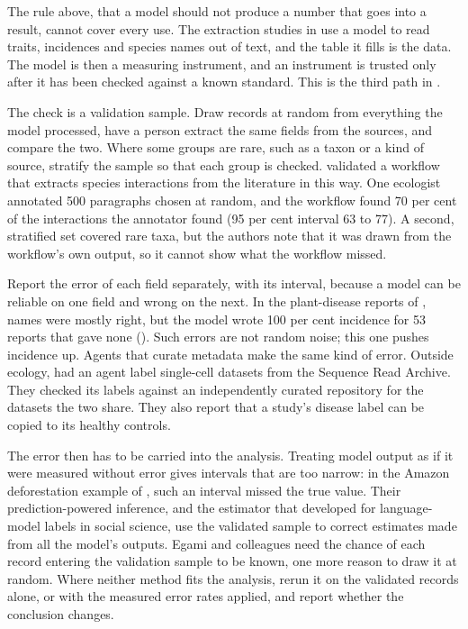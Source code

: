 The rule above, that a model should not produce a number that goes into a
result, cannot cover every use. The extraction studies in
 use a model to read traits, incidences and species
names out of text, and the table it fills is the data. The model is then a
measuring instrument, and an instrument is trusted only after it has been
checked against a known standard. This is the third path in .

The check is a validation sample. Draw records at random from everything the
model processed, have a person extract the same fields from the sources, and
compare the two. Where some groups are rare, such as a taxon or a kind of
source, stratify the sample so that each group is checked.
\textcite{keck2026interactions} validated a workflow that extracts species
interactions from the literature in this way. One ecologist annotated 500
paragraphs chosen at random, and the workflow found 70 per cent of the
interactions the annotator found (95 per cent interval 63 to 77). A second,
stratified set covered rare taxa, but the authors note that it was drawn from
the workflow's own output, so it cannot show what the workflow missed.

Report the error of each field separately, with its interval, because a model
can be reliable on one field and wrong on the next. In the plant-disease
reports of \textcite{gougherty2024extraction}, names were mostly right, but
the model wrote 100 per cent incidence for 53 reports that gave none
(). Such errors are not random noise; this one pushes
incidence up. Agents that curate metadata make the same kind of error.
Outside ecology, \textcite{youngblut2026scbasecount} had an agent label
single-cell datasets from the Sequence Read Archive. They checked its labels
against an independently curated repository for the datasets the two share.
They also report that a study's disease label can be copied to its healthy
controls.

The error then has to be carried into the analysis. Treating model output as
if it were measured without error gives intervals that are too narrow: in the
Amazon deforestation example of \textcite{angelopoulos2023ppi}, such an
interval missed the true value. Their prediction-powered inference, and the
estimator that \textcite{egami2023surrogates} developed for language-model
labels in social science, use the validated sample to correct estimates made
from all the model's outputs. Egami and colleagues need the chance of each
record entering the validation sample to be known, one more reason to draw it
at random. Where neither method fits the analysis, rerun it on the validated
records alone, or with the measured error rates applied, and report whether
the conclusion changes.

